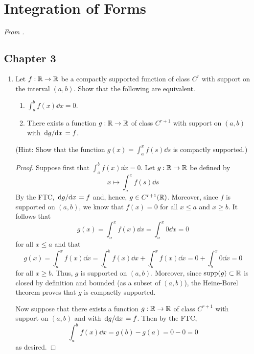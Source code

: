 \documentclass[../psets.tex]{subfiles}
\begin{document}
\section{Integration of Forms}
\emph{From \textcite{bib:DifferentialForms}.}
\subsection*{Chapter 3}
\begin{enumerate}[label={\textbf{3.2.\roman*.}}]
    \item {}Let $f:\mathbb{R}\to\mathbb{R}$ be a compactly supported function of class $C^r$ with support on the interval $(a,b)$. Show that the following are equivalent.
    \begin{enumerate}
        \item $\int_a^bf(x)\dd{x}=0$.
        \item There exists a function $g:\mathbb{R}\to\mathbb{R}$ of class $C^{r+1}$ with support on $(a,b)$ with $\dv*{g}{x}=f$.
    \end{enumerate}
    (Hint: Show that the function $g(x)=\int_a^xf(s)\dd{s}$ is compactly supported.)
    \begin{proof}
        Suppose first that $\int_a^bf(x)\dd{x}=0$. Let $g:\mathbb{R}\to\mathbb{R}$ be defined by
        \begin{equation*}
            x \mapsto \int_a^xf(s)\dd{s}
        \end{equation*}
        By the FTC, $\dv*{g}{x}=f$ and, hence, $g\in C^{r+1}(\mathbb{R})$. Moreover, since $f$ is supported on $(a,b)$, we know that $f(x)=0$ for all $x\leq a$ and $x\geq b$. It follows that
        \begin{equation*}
            g(x) = \int_a^xf(x)\dd{x}
            = \int_a^x0\dd{x}
            = 0
        \end{equation*}
        for all $x\leq a$ and that
        \begin{equation*}
            g(x) = \int_a^xf(x)\dd{x}
            = \int_a^bf(x)\dd{x}+\int_b^xf(x)\dd{x}
            = 0+\int_b^x0\dd{x}
            = 0
        \end{equation*}
        for all $x\geq b$. Thus, $g$ is supported on $(a,b)$. Moreover, since $\operatorname{supp}(g)\subset\mathbb{R}$ is closed by definition and bounded (as a subset of $(a,b)$), the Heine-Borel theorem proves that $g$ is compactly supported.\par
        Now suppose that there exists a function $g:\mathbb{R}\to\mathbb{R}$ of class $C^{r+1}$ with support on $(a,b)$ and with $\dv*{g}{x}=f$. Then by the FTC,
        \begin{equation*}
            \int_a^bf(x)\dd{x} = g(b)-g(a)
            = 0-0
            = 0
        \end{equation*}
        as desired.
    \end{proof}
\end{enumerate}
\end{document}
